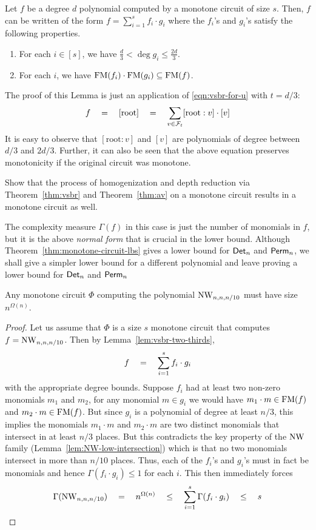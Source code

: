 \begin{lemma}\label{lem:vsbr-two-thirds}
  Let $f$ be a degree $d$ polynomial computed by a monotone circuit of size $s$. Then, $f$ can be written of the form $f = \sum_{i=1}^s f_i \cdot g_i$ where the $f_i$'s and $g_i$'s satisfy the following properties.
\begin{enumerate}
\item For each $i\in [s]$, we have $\frac{d}{3} < \deg{g_i} \leq
  \frac{2d}{3}$.
\item For each $i$, we have $\mathrm{FM}(f_i)\cdot \mathrm{FM}(g_i) \subseteq \mathrm{FM}(f)$.
\end{enumerate}
\end{lemma}
\begin{proof-sketch}
The proof of this Lemma is just an application of \eqref{eqn:vsbr-for-u} with $t = d/3$: 
\[
f\quad = \quad [\mathrm{root}] \quad = \quad \sum_{v\in \mathcal{F}_t} [\mathrm{root}:v] \cdot [v]
\]
It is easy to observe that $[\mathrm{root}:v]$ and $[v]$ are polynomials of degree between $d/3$ and $2d/3$. Further, it can also be seen that the above equation  preserves monotonicity if the original circuit was monotone. 
\end{proof-sketch}

\begin{exercise}
Show that the process of homogenization and depth reduction via Theorem~\ref{thm:vsbr} and Theorem~\ref{thm:av} on a monotone circuit results in a  monotone circuit as well. 
\end{exercise}


The complexity measure $\Gamma(f)$ in this case is just the number of monomials in $f$, but it is the above \emph{normal form} that is crucial in the lower bound. Although Theorem~\ref{thm:monotone-circuit-lbs} gives a lower bound for $\mathsf{Det}_n$ and $\mathsf{Perm}_n$, we shall give a simpler lower bound for a different polynomial and leave proving a lower bound for $\mathsf{Det}_n$ and $\mathsf{Perm}_n$ 


\begin{theorem}
Any monotone circuit $\Phi$ computing the polynomial $\mathrm{NW}_{n,n,n/10}$  must have size $n^{\Omega(n)}$. 
\end{theorem}
\begin{proof}
  Let us assume that $\Phi$ is a size $s$ monotone circuit that computes $f = \mathrm{NW}_{n,n,n/10}$. Then by Lemma~\ref{lem:vsbr-two-thirds},
  \[
  f \quad = \quad \sum_{i=1}^s f_i \cdot g_i
  \]
  with the appropriate degree bounds. Suppose $f_i$ had at least two non-zero monomials $m_1$ and $m_2$, for any monomial $m \in g_i$ we would have $m_1 \cdot m \in \mathrm{FM}(f)$ and $m_2 \cdot m \in \mathrm{FM}(f)$. But since $g_i$ is a polynomial of degree at least $n/3$, this implies the monomials $m_1\cdot m$ and $m_2 \cdot m$ are two distinct monomials that intersect in at least $n/3$ places. But this contradicts the key property of the $\mathrm{NW}$ family (Lemma~\ref{lem:NW-low-intersection}) which is that no two monomials intersect in more than $n/10$ places. Thus, each of the $f_i$'s and $g_i$'s must in fact be monomials and hence $\Gamma(f_i\cdot g_i) \leq 1$ for each $i$. This then immediately forces 
\[
\Gamma(\mathrm{NW}_{n,n,n/10}) \quad = \quad n^{\Omega(n)} \quad \leq \quad \sum_{i=1}^s \Gamma(f_i \cdot g_i) \quad \leq \quad s
\]
\end{proof}

